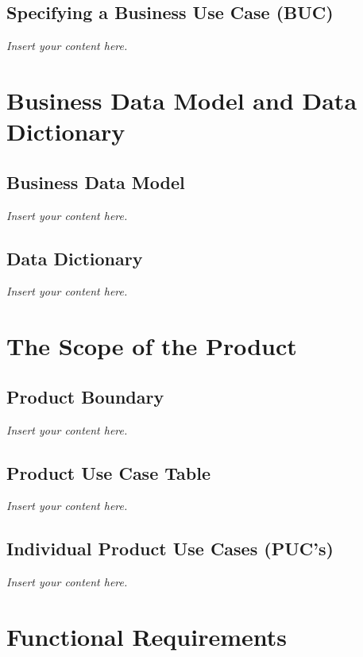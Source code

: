 \documentclass[12pt]{article}
\newcommand{\lips}{\textit{Insert your content here.}}
\begin{document}
\subsection{Specifying a Business Use Case (BUC)}
\lips

\section{Business Data Model and Data Dictionary}
\subsection{Business Data Model}
\lips
\subsection{Data Dictionary}
\lips

\section{The Scope of the Product}
\subsection{Product Boundary}
\lips
\subsection{Product Use Case Table}
\lips
\subsection{Individual Product Use Cases (PUC's)}
\lips

\section{Functional Requirements}
\end{document}

